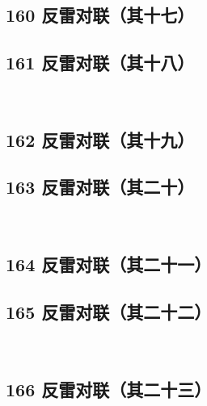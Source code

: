 ~\\

\hypertarget{ux53cdux96f7ux5bf9ux8054ux5176ux5341ux4e03}{%
\subsection{160
反雷对联（其十七）}\label{ux53cdux96f7ux5bf9ux8054ux5176ux5341ux4e03}}

\hypertarget{ux53cdux96f7ux5bf9ux8054ux5176ux5341ux516b}{%
\subsection{161
反雷对联（其十八）}\label{ux53cdux96f7ux5bf9ux8054ux5176ux5341ux516b}}

~\\

\hypertarget{ux53cdux96f7ux5bf9ux8054ux5176ux5341ux4e5d}{%
\subsection{162
反雷对联（其十九）}\label{ux53cdux96f7ux5bf9ux8054ux5176ux5341ux4e5d}}

\hypertarget{ux53cdux96f7ux5bf9ux8054ux5176ux4e8cux5341}{%
\subsection{163
反雷对联（其二十）}\label{ux53cdux96f7ux5bf9ux8054ux5176ux4e8cux5341}}

~\\

\hypertarget{ux53cdux96f7ux5bf9ux8054ux5176ux4e8cux5341ux4e00}{%
\subsection{164
反雷对联（其二十一）}\label{ux53cdux96f7ux5bf9ux8054ux5176ux4e8cux5341ux4e00}}

\hypertarget{ux53cdux96f7ux5bf9ux8054ux5176ux4e8cux5341ux4e8c}{%
\subsection{165
反雷对联（其二十二）}\label{ux53cdux96f7ux5bf9ux8054ux5176ux4e8cux5341ux4e8c}}

~\\

\hypertarget{ux53cdux96f7ux5bf9ux8054ux5176ux4e8cux5341ux4e09}{%
\subsection{166
反雷对联（其二十三）}\label{ux53cdux96f7ux5bf9ux8054ux5176ux4e8cux5341ux4e09}}

